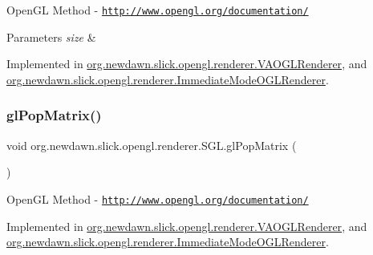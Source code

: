 Open\+GL Method -\/  \href{http://www.opengl.org/documentation/}{\tt http\+://www.\+opengl.\+org/documentation/}


\begin{DoxyParams}{Parameters}
{\em size} & \\
\hline
\end{DoxyParams}


Implemented in \mbox{\hyperlink{classorg_1_1newdawn_1_1slick_1_1opengl_1_1renderer_1_1_v_a_o_g_l_renderer_a51b4eb9ab5ed3efe4021472ffecb5041}{org.\+newdawn.\+slick.\+opengl.\+renderer.\+V\+A\+O\+G\+L\+Renderer}}, and \mbox{\hyperlink{classorg_1_1newdawn_1_1slick_1_1opengl_1_1renderer_1_1_immediate_mode_o_g_l_renderer_a94ff70b3e1685df7109524b1a6e10b9c}{org.\+newdawn.\+slick.\+opengl.\+renderer.\+Immediate\+Mode\+O\+G\+L\+Renderer}}.

\mbox{\label{interfaceorg_1_1newdawn_1_1slick_1_1opengl_1_1renderer_1_1_s_g_l_ab8fd54b37e504c0b72d8b18b90c94c41}} 
\subsubsection{\texorpdfstring{gl\+Pop\+Matrix()}{glPopMatrix()}}
{\footnotesize\ttfamily void org.\+newdawn.\+slick.\+opengl.\+renderer.\+S\+G\+L.\+gl\+Pop\+Matrix (\begin{DoxyParamCaption}{ }\end{DoxyParamCaption})}

Open\+GL Method -\/  \href{http://www.opengl.org/documentation/}{\tt http\+://www.\+opengl.\+org/documentation/} 

Implemented in \mbox{\hyperlink{classorg_1_1newdawn_1_1slick_1_1opengl_1_1renderer_1_1_v_a_o_g_l_renderer_a9d7e65f8c87a2a10a24ef196a7f83d12}{org.\+newdawn.\+slick.\+opengl.\+renderer.\+V\+A\+O\+G\+L\+Renderer}}, and \mbox{\hyperlink{classorg_1_1newdawn_1_1slick_1_1opengl_1_1renderer_1_1_immediate_mode_o_g_l_renderer_aa0deb1e58ef2250ce793cd6966bcdd70}{org.\+newdawn.\+slick.\+opengl.\+renderer.\+Immediate\+Mode\+O\+G\+L\+Renderer}}.

\mbox{\label{interfaceorg_1_1newdawn_1_1slick_1_1opengl_1_1renderer_1_1_s_g_l_ae9904a980aa014796bf1dcd748b63056}} 
